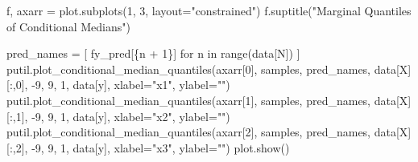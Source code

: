 \documentclass[
  letterpaper,
  DIV=11,
  numbers=noendperiod]{scrartcl}
\newenvironment{Shaded}{\begin{snugshade}}{\end{snugshade}}
\newcommand{\BuiltInTok}[1]{\textcolor[rgb]{0.00,0.23,0.31}{#1}}
\newcommand{\ControlFlowTok}[1]{\textcolor[rgb]{0.00,0.23,0.31}{#1}}
\newcommand{\DecValTok}[1]{\textcolor[rgb]{0.68,0.00,0.00}{#1}}
\newcommand{\KeywordTok}[1]{\textcolor[rgb]{0.00,0.23,0.31}{#1}}
\newcommand{\NormalTok}[1]{\textcolor[rgb]{0.00,0.23,0.31}{#1}}
\newcommand{\OperatorTok}[1]{\textcolor[rgb]{0.37,0.37,0.37}{#1}}
\newcommand{\SpecialCharTok}[1]{\textcolor[rgb]{0.37,0.37,0.37}{#1}}
\newcommand{\SpecialStringTok}[1]{\textcolor[rgb]{0.13,0.47,0.30}{#1}}
\newcommand{\StringTok}[1]{\textcolor[rgb]{0.13,0.47,0.30}{#1}}
\begin{document}
\begin{Shaded}
\begin{Highlighting}[]
\NormalTok{f, axarr }\OperatorTok{=}\NormalTok{ plot.subplots(}\DecValTok{1}\NormalTok{, }\DecValTok{3}\NormalTok{, layout}\OperatorTok{=}\StringTok{"constrained"}\NormalTok{)}
\NormalTok{f.suptitle(}\StringTok{"Marginal Quantiles of Conditional Medians"}\NormalTok{)}

\NormalTok{pred\_names }\OperatorTok{=}\NormalTok{ [ }\SpecialStringTok{f\textquotesingle{}y\_pred[}\SpecialCharTok{\{}\NormalTok{n }\OperatorTok{+} \DecValTok{1}\SpecialCharTok{\}}\SpecialStringTok{]\textquotesingle{}} \ControlFlowTok{for}\NormalTok{ n }\KeywordTok{in} \BuiltInTok{range}\NormalTok{(data[}\StringTok{\textquotesingle{}N\textquotesingle{}}\NormalTok{]) ]}
\NormalTok{putil.plot\_conditional\_median\_quantiles(axarr[}\DecValTok{0}\NormalTok{], samples, pred\_names,}
\NormalTok{                                        data[}\StringTok{\textquotesingle{}X\textquotesingle{}}\NormalTok{][:,}\DecValTok{0}\NormalTok{], }\OperatorTok{{-}}\DecValTok{9}\NormalTok{, }\DecValTok{9}\NormalTok{, }\DecValTok{1}\NormalTok{,}
\NormalTok{                                        data[}\StringTok{\textquotesingle{}y\textquotesingle{}}\NormalTok{], xlabel}\OperatorTok{=}\StringTok{"x1"}\NormalTok{, ylabel}\OperatorTok{=}\StringTok{""}\NormalTok{)}
\NormalTok{putil.plot\_conditional\_median\_quantiles(axarr[}\DecValTok{1}\NormalTok{], samples, pred\_names,}
\NormalTok{                                        data[}\StringTok{\textquotesingle{}X\textquotesingle{}}\NormalTok{][:,}\DecValTok{1}\NormalTok{], }\OperatorTok{{-}}\DecValTok{9}\NormalTok{, }\DecValTok{9}\NormalTok{, }\DecValTok{1}\NormalTok{,}
\NormalTok{                                        data[}\StringTok{\textquotesingle{}y\textquotesingle{}}\NormalTok{], xlabel}\OperatorTok{=}\StringTok{"x2"}\NormalTok{, ylabel}\OperatorTok{=}\StringTok{""}\NormalTok{)}
\NormalTok{putil.plot\_conditional\_median\_quantiles(axarr[}\DecValTok{2}\NormalTok{], samples, pred\_names,}
\NormalTok{                                        data[}\StringTok{\textquotesingle{}X\textquotesingle{}}\NormalTok{][:,}\DecValTok{2}\NormalTok{], }\OperatorTok{{-}}\DecValTok{9}\NormalTok{, }\DecValTok{9}\NormalTok{, }\DecValTok{1}\NormalTok{,}
\NormalTok{                                        data[}\StringTok{\textquotesingle{}y\textquotesingle{}}\NormalTok{], xlabel}\OperatorTok{=}\StringTok{"x3"}\NormalTok{, ylabel}\OperatorTok{=}\StringTok{""}\NormalTok{)}
\NormalTok{plot.show()}


\end{Highlighting}
\end{Shaded}
\end{document}

